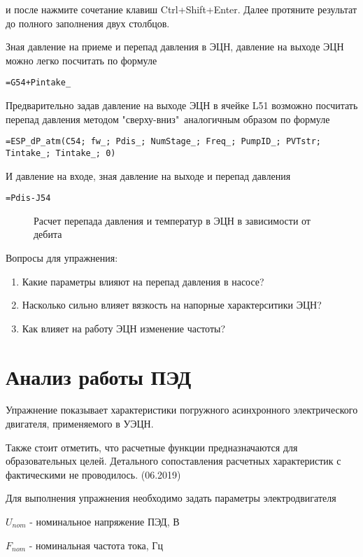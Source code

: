 и после нажмите сочетание клавиш  Ctrl+Shift+Enter. Далее протяните результат до полного заполнения двух столбцов.

Зная давление на приеме и перепад давления в ЭЦН, давление на выходе ЭЦН можно легко посчитать по формуле

{ \small  \texttt{=G54+Pintake\_}}

Предварительно задав давление на выходе ЭЦН в ячейке L51 возможно посчитать перепад давления методом "сверху-вниз"\ аналогичным образом по формуле

{ \small  \texttt{=ESP\_dP\_atm(C54; fw\_; Pdis\_; NumStage\_; Freq\_; PumpID\_; PVTstr; Tintake\_; Tintake\_; 0)}}

И давление на входе, зная давление на выходе и перепад давления

{ \small  \texttt{=Pdis-J54}}

\begin{figure}[h!]
	\center{\texttt{[image: Ex70\_4]}}
	\caption{Расчет перепада давления и температур в ЭЦН в зависимости от дебита}
	\label{ris:Ex70_4}
\end{figure}

Вопросы для упражнения:

\begin{enumerate}
	\item Какие параметры влияют на перепад давления в насосе?
	\item Насколько сильно влияет вязкость на напорные характерситики ЭЦН?
	\item Как влияет на работу ЭЦН изменение частоты?
\end{enumerate}


\section{Анализ работы ПЭД}

Упражнение показывает характеристики погружного асинхронного электрического двигателя, применяемого в УЭЦН.

Также стоит отметить, что расчетные функции предназначаются для образовательных целей. Детального сопоставления расчетных характеристик с фактическими не проводилось. (06.2019)

Для выполнения упражнения необходимо задать параметры электродвигателя

$U_{nom}$ - номинальное напряжение ПЭД, В

$F_{nom}$ - номинальная частота тока, Гц

